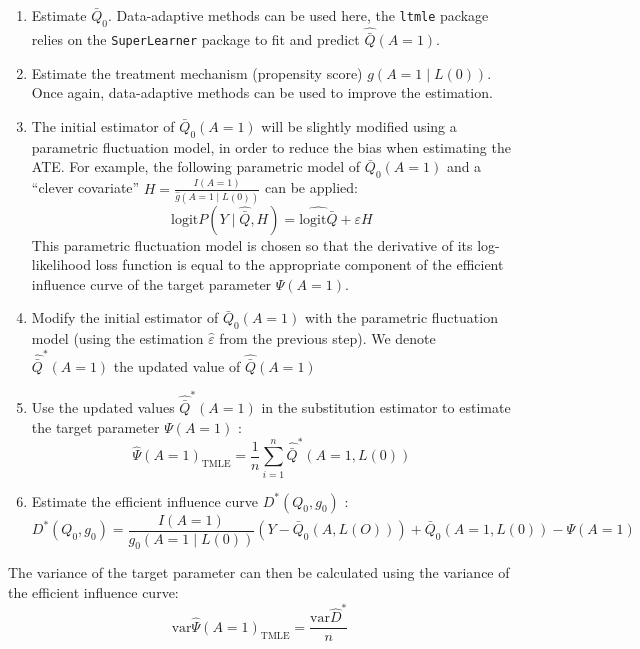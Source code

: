 \documentclass[
]{book}
\begin{document}
\begin{enumerate}
\def\labelenumi{\arabic{enumi}.}
\item
  Estimate \(\bar{Q}_0\). Data-adaptive methods can be used here, the \texttt{ltmle} package relies on the \texttt{SuperLearner} package to fit and predict \(\hat{\bar{Q}}(A=1)\).
\item
  Estimate the treatment mechanism (propensity score) \(g(A=1 \mid L(0))\). Once again, data-adaptive methods can be used to improve the estimation.
\item
  The initial estimator of \(\bar{Q}_0(A=1)\) will be slightly modified using a parametric fluctuation model, in order to reduce the bias when estimating the ATE. For example, the following parametric model of \(\bar{Q}_0(A=1)\) and a ``clever covariate'' \(H = \frac{I(A=1)}{\hat{g}(A=1 \mid L(0))}\) can be applied:
  \begin{equation*}
   \text{logit} P(Y \mid \hat{\bar{Q}}, H) = \hat{\text{logit} \bar{Q}} + \varepsilon H
  \end{equation*}
  This parametric fluctuation model is chosen so that the derivative of its log-likelihood loss function is equal to the appropriate component of the efficient influence curve of the target parameter \(\Psi(A=1)\).
\item
  Modify the initial estimator of \(\bar{Q}_0(A=1)\) with the parametric fluctuation model (using the estimation \(\hat{\varepsilon}\) from the previous step). We denote \(\hat{\bar{Q}}^*(A=1)\) the updated value of \(\hat{\bar{Q}}(A=1)\)
\item
  Use the updated values \(\hat{\bar{Q}}^*(A=1)\) in the substitution estimator to estimate the target parameter \(\Psi(A=1)\) :
  \begin{equation*}
  \hat{\Psi}(A=1)_\text{TMLE} = \frac{1}{n} \sum_{i=1}^n \hat{\bar{Q}}^* (A=1,L(0)) 
  \end{equation*}
\item
  Estimate the efficient influence curve \(D^*(Q_0,g_0)\) :
  \begin{equation*}
  D^*(Q_0,g_0) = \frac{I(A=1)}{g_0(A=1 \mid L(0))}(Y - \bar{Q}_0(A,L(O))) + \bar{Q}_0(A=1,L(0))  - \Psi(A=1)
  \end{equation*}
\end{enumerate}

The variance of the target parameter can then be calculated using the variance of the efficient influence curve:
\begin{equation*}
\text{var} \hat{\Psi}(A=1)_\text{TMLE} = \frac{\text{var} \hat{D}^*}{n}
\end{equation*}
\end{document}
